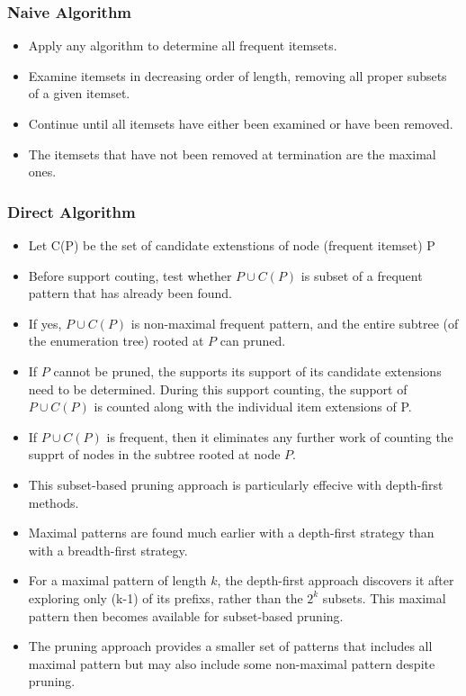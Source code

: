 \documentclass[../notes.tex]{subfiles}
\begin{document}
\subsubsection{Naive Algorithm}
\begin{itemize} 
  \item Apply any algorithm to determine all frequent itemsets.
  \item Examine itemsets in decreasing order of length, removing all proper subsets of a given itemset.
  \item Continue until all itemsets have either been examined or have been removed.
  \item The itemsets that have not been removed at termination are the maximal ones.
\end{itemize}

\subsubsection{Direct Algorithm}
\begin{itemize} 
  \item Let C(P) be the set of candidate extenstions of node (frequent itemset) P
  \item Before support couting, test whether $P \cup C(P)$ is subset of a frequent pattern that has already been found.
  \item If yes, $P \cup C(P)$ is non-maximal frequent pattern, and the entire subtree (of the enumeration tree) rooted at $P$ can pruned.
  \item If $P$ cannot be pruned, the supports its support of its candidate extensions need to be determined. During this support counting, the support of $P \cup C(P)$ is counted along with the individual item extensions of P.
  \item If $P \cup C(P)$ is frequent, then it eliminates any further work of counting the supprt of nodes in the subtree rooted at node $P$.
  \item This subset-based pruning approach is particularly effecive with depth-first methods.
  \item Maximal patterns are found much earlier with a depth-first strategy than with a breadth-first strategy.
  \item For a maximal pattern of length $k$, the depth-first approach discovers it after exploring only (k-1) of its prefixs, rather than the $2^k$ subsets. This maximal pattern then becomes available for subset-based pruning.
  \item The pruning approach provides a smaller set of patterns that includes all maximal pattern but may also include some non-maximal pattern despite pruning.
\end{itemize}
\end{document}
